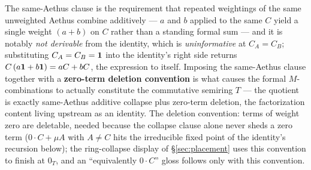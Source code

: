 The same-Aethus clause is the requirement that repeated weightings of the same unweighted Aethus combine additively --- $a$ and $b$ applied to the same $C$ yield a single weight $(a+b)$ on $C$ rather than a standing formal sum --- and it is notably \emph{not derivable} from the identity, which is \emph{uninformative} at $C_A = C_B$; substituting $C_A = C_B = \mathbf{1}$ into the identity's right side returns $C\,(a\mathbf{1} + b\mathbf{1}) = aC + bC$, the expression to itself. Imposing the same-Aethus clause together with a \textbf{zero-term deletion convention} is what causes the formal $M$-combinations to actually constitute the commutative semiring $T$ --- the quotient is exactly same-Aethus additive collapse plus zero-term deletion, the factorization content living upstream as an identity. The deletion convention: terms of weight zero are deletable, needed because the collapse clause alone never sheds a zero term ($0 \cdot C + \mu A$ with $A \neq C$ hits the irreducible fixed point of the identity's recursion below); the ring-collapse display of §\ref{sec:placement} uses this convention to finish at $0_T$, and an ``equivalently $0 \cdot C$'' gloss follows only with this convention.
